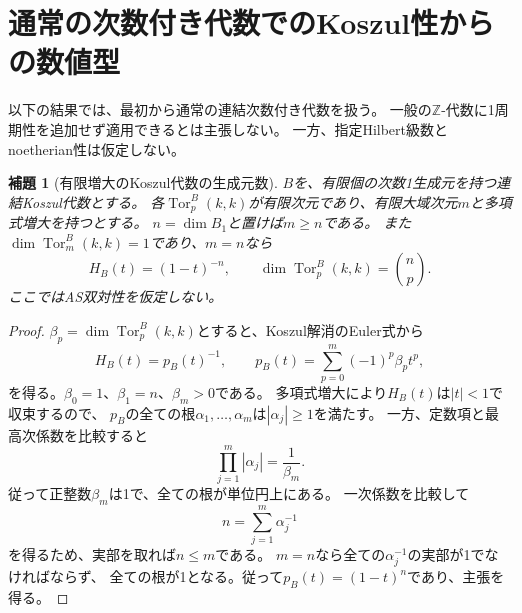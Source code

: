 \documentclass[11pt,a4paper]{ltjsarticle}
\newtheorem{lemma}[theorem]{補題}
\theoremstyle{definition}
\begin{document}
\section{通常の次数付き代数でのKoszul性からの数値型}
\label{ogk:sec:numerics}

以下の結果では、最初から通常の連結次数付き代数を扱う。
一般の$\mathbb Z$-代数に1周期性を追加せず適用できるとは主張しない。
一方、指定Hilbert級数とnoetherian性は仮定しない。

\begin{lemma}[有限増大のKoszul代数の生成元数]\label{ogk:lem:generator-bound}
$B$を、有限個の次数1生成元を持つ連結Koszul代数とする。
各$\operatorname{Tor}^B_p(k,k)$が有限次元であり、有限大域次元$m$と多項式増大を持つとする。
$n=\dim B_1$と置けば$m\geq n$である。
また$\dim\operatorname{Tor}^B_m(k,k)=1$であり、$m=n$なら
\[
H_B(t)=(1-t)^{-n},\qquad
\dim\operatorname{Tor}^B_p(k,k)=\binom np.
\]
ここではAS双対性を仮定しない。
\end{lemma}
\begin{proof}
$\beta_p=\dim\operatorname{Tor}^B_p(k,k)$とすると、Koszul解消のEuler式から
\[
H_B(t)=p_B(t)^{-1},\qquad
p_B(t)=\sum_{p=0}^m(-1)^p\beta_pt^p,
\]
を得る。$\beta_0=1$、$\beta_1=n$、$\beta_m>0$である。
多項式増大により$H_B(t)$は$|t|<1$で収束するので、
$p_B$の全ての根$\alpha_1,\ldots,\alpha_m$は$|\alpha_j|\geq1$を満たす。
一方、定数項と最高次係数を比較すると
\[
\prod_{j=1}^m|\alpha_j|=\frac1{\beta_m}.
\]
従って正整数$\beta_m$は1で、全ての根が単位円上にある。
一次係数を比較して
\[
n=\sum_{j=1}^m\alpha_j^{-1}
\]
を得るため、実部を取れば$n\leq m$である。
$m=n$なら全ての$\alpha_j^{-1}$の実部が1でなければならず、
全ての根が1となる。従って$p_B(t)=(1-t)^n$であり、主張を得る。
\end{proof}
\end{document}
